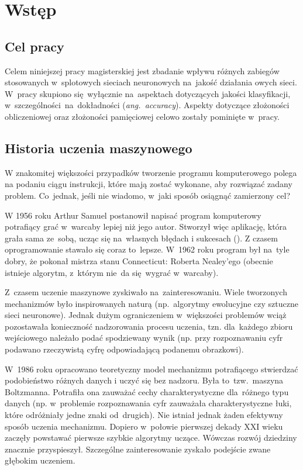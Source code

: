 \chapter{Wstęp}
\section{Cel pracy}
Celem niniejszej pracy magisterskiej jest zbadanie wpływu różnych zabiegów
stosowanych w~splotowych sieciach neuronowych na~jakość działania owych sieci.
W~pracy skupiono się~wyłącznie na~aspektach dotyczących jakości klasyfikacji,
w~szczególności~na~dokładności (\textit{ang.~accuracy}). Aspekty dotyczące złożoności
obliczeniowej oraz złożoności pamięciowej celowo zostały pominięte w~pracy.

\section{Historia uczenia maszynowego}
W znakomitej większości przypadków tworzenie programu komputerowego polega
na podaniu ciągu instrukcji, które mają zostać wykonane, aby rozwiązać zadany
problem. Co~jednak, jeśli nie wiadomo, w~jaki sposób osiągnąć zamierzony cel?

W 1956 roku Arthur Samuel postanowił napisać program komputerowy
potrafiący grać w~warcaby lepiej niż jego autor. Stworzył więc aplikację,
która grała sama ze~sobą, ucząc się na~własnych błędach i sukcesach (\cite{checkers-samuel}).
Z czasem oprogramowanie stawało się coraz to~lepsze. W~1962 roku program był
na~tyle dobry, że pokonał mistrza stanu Connecticut: Roberta Nealey'ego
(obecnie istnieje algorytm, z~którym nie~da się~wygrać w~warcaby).

Z~czasem uczenie maszynowe zyskiwało na~zainteresowaniu.
Wiele tworzonych mechanizmów było inspirowanych naturą (np.~algorytmy
ewolucyjne czy sztuczne sieci neuronowe). Jednak dużym ograniczeniem
w~większości problemów wciąż pozostawała konieczność nadzorowania procesu
uczenia, tzn. dla~każdego zbioru wejściowego należało podać spodziewany wynik
(np. przy rozpoznawaniu cyfr podawano rzeczywistą cyfrę odpowiadającą podanemu
obrazkowi).

W~1986 roku opracowano teoretyczny model mechanizmu potrafiącego stwierdzać
podobieństwo różnych danych i uczyć się bez nadzoru. Była to~tzw.~maszyna
Boltzmanna. Potrafiła ona zauważać cechy charakterystyczne dla~różnego typu
danych (np. w~problemie rozpoznawania cyfr zauważała charakterystyczne łuki,
które odróżniały jedne znaki od~drugich).
Nie istniał jednak żaden efektywny sposób uczenia mechanizmu.
Dopiero w~połowie pierwszej dekady XXI wieku zaczęły powstawać pierwsze szybkie
algorytmy uczące. Wówczas rozwój dziedziny znacznie przyspieszył.
Szczególne zainteresowanie zyskało podejście zwane głębokim uczeniem.

